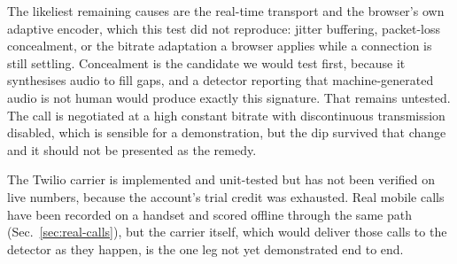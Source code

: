 The likeliest remaining causes are the real-time transport and the browser's own adaptive
encoder, which this test did not reproduce: jitter buffering, packet-loss concealment, or the bitrate adaptation a browser
applies while a connection is still settling. Concealment is the candidate we would
test first, because it synthesises audio to fill gaps, and a detector reporting that
machine-generated audio is not human would produce exactly this signature. That
remains untested. The call is negotiated at a high constant bitrate with
discontinuous transmission disabled, which is sensible for a demonstration, but the
dip survived that change and it should not be presented as the remedy.

The Twilio carrier is implemented and unit-tested but has not been verified on live
numbers, because the account's trial credit was exhausted. Real mobile calls have been
recorded on a handset and scored offline through the same path (Sec.~\ref{sec:real-calls}),
but the carrier itself, which would deliver those calls to the detector as they happen, is
the one leg not yet demonstrated end to end.
